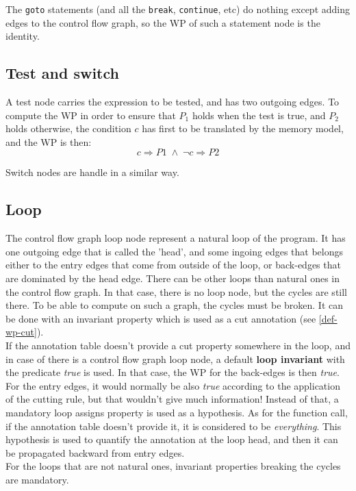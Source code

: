 The {\tt goto} statements (and all the {\tt break}, {\tt continue}, etc)
do nothing except adding edges to the control flow graph,
so the WP of such a statement node is the identity.

\subsection{Test and switch}\label{def-wp-if}

A test node carries the expression to be tested, and has two outgoing edges.
To compute the WP in order to ensure that \(P_1\) holds 
when the test is true, and \(P_2\) holds otherwise,
the condition \(c\) has first to be translated by the memory model,
and the WP is then:
\[
c \Rightarrow P1 \; \wedge \; \neg c \Rightarrow P2
\]

Switch nodes are handle in a similar way.

\subsection{Loop}\label{def-wp-loop}

The control flow graph loop node represent a natural loop of the program.
It has one outgoing edge that is called the 'head',
and some ingoing edges that belongs either to the entry edges that come
from outside of the loop, or back-edges that are dominated by the head edge.
There can be other loops than natural ones in the control flow graph. 
In that case, there is no loop node, but the cycles are still there.
To be able to compute on such a graph, the cycles must be broken.
It can be done with an invariant property which is used
as a cut annotation (see \ref{def-wp-cut}).\\

If the annotation table doesn't provide a cut property somewhere in the loop,
and in case of there is a control flow graph loop node,
a default {\bf loop invariant} with the predicate {\it true} is used.
In that case, the WP for the back-edges is then {\it true}.
For the entry edges, it would normally be also {\it true} according to the
application of the cutting rule, but that wouldn't give much information!
Instead of that, a mandatory loop assigns property is used as a hypothesis.
As for the function call, if the annotation table doesn't provide it,
it is considered to be {\it everything}.
This hypothesis is used to quantify the annotation at the loop head,
and then it can be propagated backward from entry edges.\\

For the loops that are not natural ones, invariant properties breaking the
cycles are mandatory.
